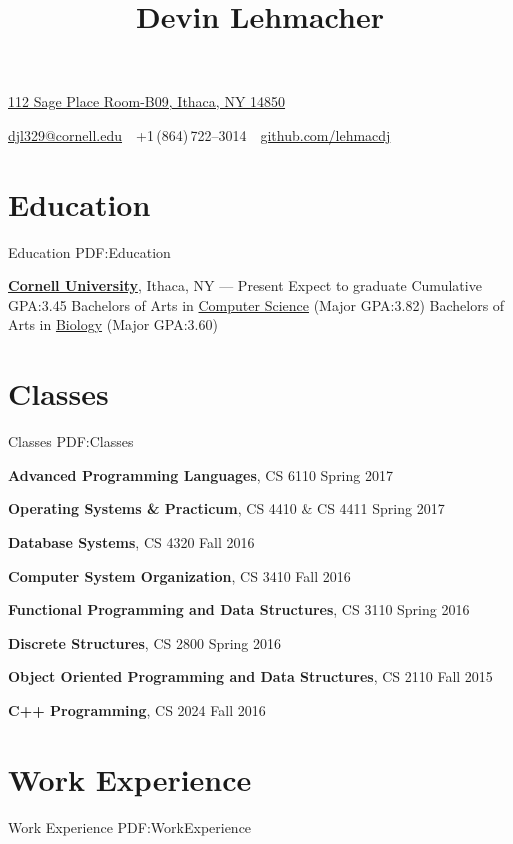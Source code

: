 \documentclass[letterpaper,10pt,oneside]{simpleresume}
\newcommand{\CVAuthor}{Devin Lehmacher}
\newcommand{\CVWebpage}{github.com/lehmacdj}
\begin{document}
\begin{minipage}[t][0pt]{\linewidth}
\pagestyle{empty}

\title{\CVAuthor}

\begin{subtitle}
\href{https://www.google.com/maps/place/112+Sage+Pl+Room-B09,+Ithaca,+NY+14850}
{112 Sage Place Room-B09, Ithaca, NY 14850}
\par
\href{mailto:djl329@cornell.edu}
{djl329@cornell.edu}
\,\SubBulletSymbol\,
+1\,(864)\,722--3014
\,\SubBulletSymbol\,
\href{https://\CVWebpage}
{\CVWebpage}
\end{subtitle}

\begin{body}

\section%
{Education}
{Education}
{PDF:Education}

\href{https://www.cornell.edu}
{\textbf{Cornell University}}, Ithaca, NY
\hfill
{} --- Present
\BulletItem%
Expect to graduate 
\BulletItem%
Cumulative GPA:\@ 3.45
\BulletItem%
Bachelors of Arts in
\href{https://www.cs.cornell.edu}{Computer Science}
(Major GPA:\@ 3.82)
\BulletItem%
Bachelors of Arts in
\href{https://www.biology.cornell.edu}{Biology}
(Major GPA:\@ 3.60)

\section%
{Classes}
{Classes}
{PDF:Classes}

\textbf{Advanced Programming Languages}, CS 6110
\hfill Spring 2017

\textbf{Operating Systems \& Practicum}, CS 4410 \& CS 4411
\hfill Spring 2017

\textbf{Database Systems}, CS 4320
\hfill Fall 2016

\textbf{Computer System Organization}, CS 3410
\hfill Fall 2016

\textbf{Functional Programming and Data Structures}, CS 3110
\hfill Spring 2016

\textbf{Discrete Structures}, CS 2800
\hfill Spring 2016

\textbf{Object Oriented Programming and Data Structures}, CS 2110
\hfill Fall 2015

\textbf{C++ Programming}, CS 2024
\hfill Fall 2016

\section%
{Work Experience}
{Work Experience}
{PDF:WorkExperience}


\end{body}
\end{minipage}
\end{document}
